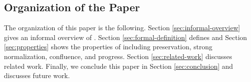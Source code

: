 \subsection{Organization of the Paper}

The organization of this paper is the following.
Section \ref{sec:informal-overview} gives an informal overview of \LMD.
Section \ref{sec:formal-definition} defines \LMD and
Section \ref{sec:properties} shows the properties of \LMD including preservation, strong normalization, confluence, and progress.
Section \ref{sec:related-work} discusses related work.
Finally, we conclude this paper in Section \ref{sec:conclusion} and discusses future work.
